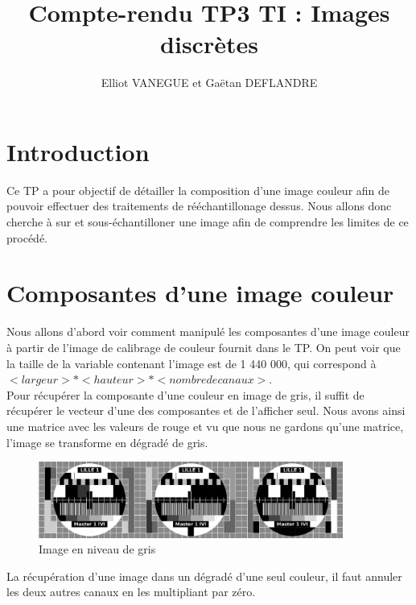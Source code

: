 \documentclass[a4paper,11pt]{article}
\title{Compte-rendu TP3 TI : Images discrètes}
\author{Elliot VANEGUE et Gaëtan DEFLANDRE}
\begin{document}


  \maketitle
  
  \mbox{}
  \newpage
  \clearpage
  
  \section*{Introduction}
  Ce TP a pour objectif de détailler la composition d'une image couleur afin de pouvoir 
  effectuer des traitements de rééchantillonage dessus. Nous allons donc cherche à sur et 
  sous-échantilloner une image afin de comprendre les limites de ce procédé.
  
  \section{Composantes d'une image couleur}
  Nous allons d'abord voir comment manipulé les composantes d'une image couleur à partir de l'image de calibrage
  de couleur fournit dans le TP. On peut voir que la taille de la variable contenant l'image est de 1 440 000,
  qui correspond à $<largeur> * <hauteur> * <nombre de canaux>$.\\
  
  Pour récupérer la composante d'une couleur en image de gris, il suffit de récupérer le vecteur d'une des composantes
  et de l'afficher seul. Nous avons ainsi une matrice avec les valeurs de rouge et vu que nous ne gardons qu'une matrice,
  l'image se transforme en dégradé de gris.\\
  
  \begin{figure}[H]
    \center
    \includegraphics[width=10cm]{../mire_gris.png}
    \caption{Image en niveau de gris}
  \end{figure}
  
  La récupération d'une image dans un dégradé d'une seul couleur, il faut annuler les deux autres canaux en les multipliant par
  zéro.
  
\end{document}
